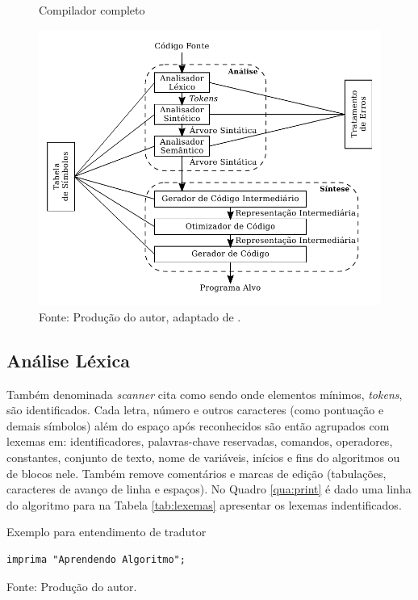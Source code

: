 \begin{figure}[h]
  \caption{\ifdraft{\color{green}}{}Compilador completo}\label{fig:fullcompiler}
  \centering
\includegraphics[width=\textwidth,keepaspectratio]{figures/compilador-completo.pdf}
  \caption*{\ifdraft{\color{green}}{}\footnotesize Fonte: Produção do autor, adaptado de .}
\end{figure}

%
\subsection{Análise Léxica}

Também denominada \textit{scanner} cita  como sendo onde elementos mínimos, \textit{tokens}, são identificados. Cada letra, número e outros caracteres (como pontuação e demais símbolos)  além do espaço após reconhecidos são então agrupados com lexemas em: identificadores, palavras-chave reservadas, comandos, operadores, constantes, conjunto de texto, nome de variáveis, inícios e fins do algoritmos ou de blocos nele. Também remove comentários e marcas de edição (tabulações, caracteres de avanço de linha e espaços). No Quadro \ref{qua:print} é dado uma linha do algoritmo para na Tabela \ref{tab:lexemas} apresentar os lexemas indentificados.

\begin{quadro}[h]
\centering
  \caption{Exemplo para entendimento de tradutor}\label{qua:print}
\begin{lstlisting}[language=ual,frame=single]
  imprima "Aprendendo Algoritmo";
\end{lstlisting}
  \caption*{\ifdraft{\color{green}}{}\footnotesize Fonte: Produção do autor.}
\end{quadro}

